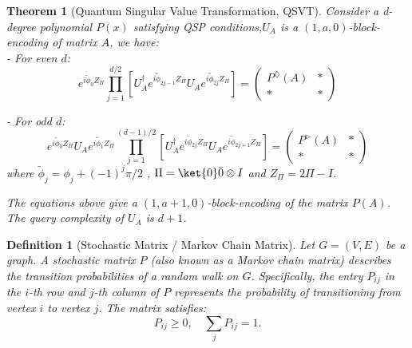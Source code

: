 \documentclass{article}
\newtheorem{definition}{Definition}[section]
\newtheorem{theorem}{Theorem}[section]
\begin{document}
    \begin{theorem}[Quantum Singular Value Transformation, QSVT]
        Consider a d-degree polynomial $ P(x) $ satisfying QSP conditions,$U_A$ is a $(1,a,0)$-block-encoding of matrix $A$, we have:\\
        - For even $ d $:
        \begin{equation}
            e^{i\tilde{\phi}_0 Z_\Pi} \prod_{j=1}^{d/2} \left[ U_A^\dagger e^{i\tilde{\phi}_{2j-1} Z_\Pi} U_A e^{i\tilde{\phi}_{2j} Z_\Pi} \right] =
            \begin{pmatrix}
                P^\diamondsuit(A) & * \\
                *                 & *
            \end{pmatrix}
        \end{equation}

        - For odd $ d $:
        \begin{equation}
            e^{i\tilde{\phi}_0 Z_\Pi} U_A e^{i\tilde{\phi}_1 Z_\Pi} \prod_{j=1}^{(d-1)/2} \left[ U_A^\dagger e^{i\tilde{\phi}_{2j} Z_\Pi} U_A e^{i\tilde{\phi}_{2j+1} Z_\Pi} \right] =
            \begin{pmatrix}
                P^\vartriangleright(A) & * \\
                *                      & *
            \end{pmatrix}
        \end{equation}
        where $ \tilde{\phi}_j = \phi_j + (-1)^j \pi/2 $ , $\Pi = \ket{0}\bar{0}\otimes I$ and $ Z_\Pi = 2\Pi - I $.

        The equations above give a $(1,a+1,0)$-block-encoding of the matrix $P(A)$.
        The query complexity of $U_A$ is $d+1$.

        \label{thm:qsvt}
    \end{theorem}

    \begin{definition}[Stochastic Matrix / Markov Chain Matrix]
        Let $ G = (V, E) $ be a graph. A stochastic matrix $ P $ (also known as a Markov chain matrix) describes the transition probabilities of a random walk on $ G $. Specifically, the entry $ P_{ij} $ in the $ i $-th row and $ j $-th column of $ P $ represents the probability of transitioning from vertex $ i $ to vertex $ j $. The matrix satisfies:
        \begin{equation}
            P_{ij} \geq 0, \quad \sum_{j} P_{ij} = 1.\label{eq:equation20}
        \end{equation}
    \end{definition}
\end{document}
